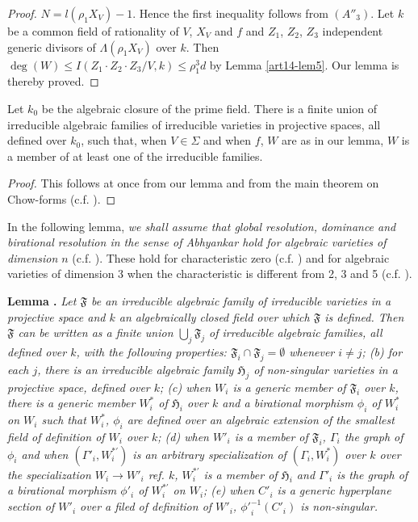 \begin{proof}
$N=l(\rho_{1}X_{V})-1$. Hence the first inequality follows from $(A''_{3})$. Let $k$ be a common field of rationality of $V$, $X_{V}$ and $f$ and $Z_{1}$, $Z_{2}$, $Z_{3}$ independent generic divisors of $\Lambda(\rho_{1}X_{V})$ over $k$. Then $\deg(W)\leq I(Z_{1}\cdot Z_{2}\cdot Z_{3}/V,k)\leq \rho^{3}_{1}d$ by Lemma \ref{art14-lem5}. Our lemma is thereby proved.
\end{proof}

\begin{coro*}
Let $k_{0}$ be the algebraic closure of the prime field. There is a finite union of irreducible algebraic families of irreducible varieties in projective spaces, all defined over $k_{0}$, such that, when $V\in \Sigma$ and when $f$, $W$ are as in our lemma, $W$ is a member of at least one of the irreducible families.
\end{coro*}

\begin{proof}
This follows at once from our lemma and from the main theorem on Chow-forms (c.f. \cite{art14-key3}).
\end{proof}

In the following lemma, {\em we shall assume that global resolution, dominance and birational resolution in the sense of Abhyankar hold for algebraic varieties of dimension $n$} (c.f. \cite{art14-key35}). These hold for characteristic zero (c.f. \cite{art14-key5}) and for algebraic varieties of dimension 3 when the characteristic is different from 2, 3 and 5 (c.f. \cite{art14-key35}).

\medskip
\noindent
{\bf Lemma .\label{art14-lem9}}
{\em Let $\mathfrak{F}$ be an irreducible algebraic family of irreducible varieties in a projective space and $k$ an algebraically closed field over which $\mathfrak{F}$ is defined. Then $\mathfrak{F}$ can be written as a finite union $\bigcup_{j}\mathfrak{F}_{j}$ of irreducible algebraic families, all defined over $k$, with the following properties: $\mathfrak{F}_{i}\cap \mathfrak{F}_{j}=\emptyset$ whenever $i\neq j$; {\rm(b)} for each $j$, there is an irreducible algebraic family $\mathfrak{H}_{j}$ of non-singular varieties in a projective space, defined over $k$; {\rm(c)} when $W_{i}$ is a generic member of $\mathfrak{F}_{i}$ over $k$, there is a generic member $W^{*}_{i}$ of $\mathfrak{H}_{i}$ over $k$ and a birational morphism $\phi_{i}$ of $W^{*}_{i}$ on $W_{i}$ such that $W^{*}_{i}$, $\phi_{i}$ are defined over an algebraic extension of the smallest field of definition of $W_{i}$ over $k$; {\rm(d)} when $W'_{i}$ is a member of $\mathfrak{F}_{i}$, $\Gamma_{i}$ the graph of $\phi_{i}$ and when $(\Gamma'_{i},W^{*'}_{i})$ is an arbitrary specialization of $(\Gamma_{i},W^{*}_{i})$ over $k$ over the specialization $W_{i}\to W'_{i}$ ref. $k$, $W^{*'}_{i}$ is a member of $\mathfrak{H}_{i}$ and $\Gamma'_{i}$ is the graph of a birational morphism $\phi'_{i}$ of $W^{*'}_{i}$ on $W_{i}$; {\rm(e)} when $C'_{i}$ is a generic hyperplane section of $W'_{i}$ over a filed of definition of $W'_{i}$, ${\phi'}^{-1}_{i}(C'_{i})$ is non-singular.}

